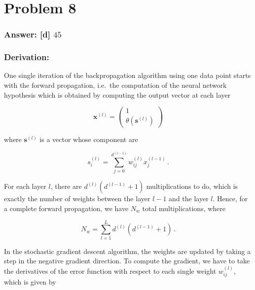 \documentclass[11pt]{article}
\begin{document}
    \hypertarget{problem-8}{%
\section{Problem 8}\label{problem-8}}

\hypertarget{answer-d-45}{%
\subsubsection{\texorpdfstring{Answer: {[}d{]}
\(45\)}{Answer: {[}d{]} 45}}\label{answer-d-45}}

\hypertarget{derivation}{%
\subsubsection{Derivation:}\label{derivation}}

One single iteration of the backpropagation algorithm using one data
point starts with the forward propagation, i.e.~the computation of the
neural network hypothesis which is obtained by computing the output
vector at each layer

\begin{equation}
\mathbf{x}^{(l)}=
\begin{pmatrix}
1\\
\theta(\mathbf{s}^{(l)})
\end{pmatrix}
\end{equation}

where \(\mathbf{s}^{(l)}\) is a vector whose component are

\begin{equation}
s_i^{(l)}=\sum_{j=0}^{d^{(l-1)}}w_{ij}^{(l)}x_j^{(l-1)}\,.
\end{equation}

For each layer \(l\), there are \(d^{(l)}(d^{(l-1)}+1)\) multiplications
to do, which is exactly the number of weights between the layer \(l-1\)
and the layer \(l\). Hence, for a complete forward propagation, we have
\(N_w\) total multiplications, where

\begin{equation}
N_w=\sum_{l=1}^L d^{(l)}(d^{(l-1)}+1)\,.
\end{equation}

In the stochastic gradient descent algorithm, the weights are updated by
taking a step in the negative gradient direction. To compute the
gradient, we have to take the derivatives of the error function with
respect to each single weight \(w_{ij}^{(l)}\), which is given by
\end{document}
